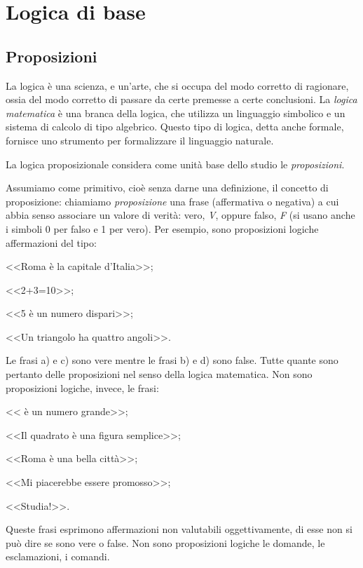
\chapter{Logica di base}

\section{Proposizioni}

La logica è una scienza, e un'arte, che si occupa del modo corretto di ragionare, ossia del modo corretto di passare da certe premesse a certe conclusioni. La \emph{logica matematica} è una branca della logica, che utilizza un linguaggio simbolico e un sistema di calcolo di tipo algebrico. Questo tipo di logica, detta anche formale, fornisce uno strumento per formalizzare il linguaggio naturale.

La logica proposizionale considera come unità base dello studio le \emph{proposizioni}.

Assumiamo come primitivo, cioè senza darne una definizione, il concetto di proposizione: chiamiamo \emph{proposizione} una frase (affermativa o negativa) a cui abbia senso associare un valore di verità: vero, \emph{V}, oppure falso, \emph{F} (si usano anche i simboli 0 per falso e 1 per vero).
Per esempio, sono proposizioni logiche affermazioni del tipo:
\begin{enumeratea}
\item <<Roma è la capitale d'Italia>>;
\item <<2+3=10>>;
\item <<5 è un numero dispari>>;
\item <<Un triangolo ha quattro angoli>>.
\end{enumeratea}
Le frasi a) e c) sono vere mentre le frasi b) e d) sono false. Tutte quante sono pertanto delle proposizioni nel senso della logica matematica.
Non sono proposizioni logiche, invece, le frasi:
\begin{enumeratea}
\item << è un numero grande>>;
\item <<Il quadrato è una figura semplice>>;
\item <<Roma è una bella città>>;
\item <<Mi piacerebbe essere promosso>>;
\item <<Studia!>>.
\end{enumeratea}
Queste frasi esprimono affermazioni non valutabili oggettivamente, di esse non si può dire se sono vere o false. Non sono proposizioni logiche le domande, le esclamazioni, i comandi.

